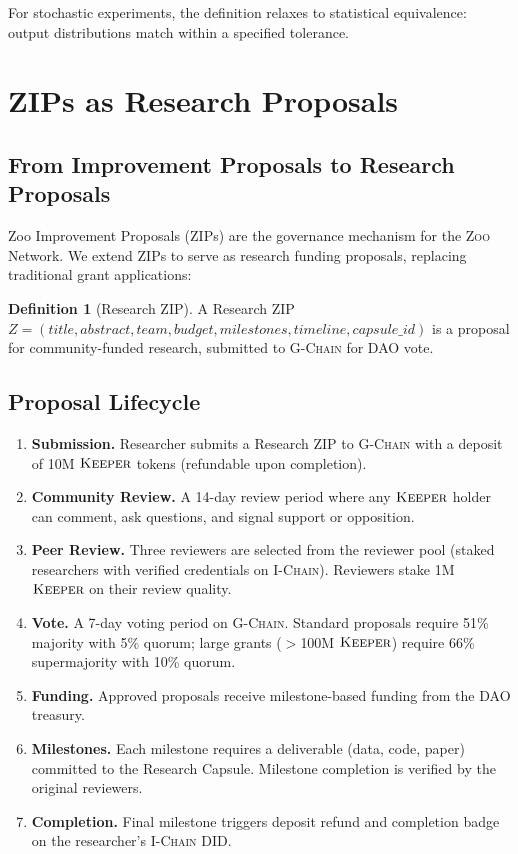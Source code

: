 \documentclass[11pt,letterpaper]{article}
\theoremstyle{definition}
\newtheorem{definition}{Definition}
\theoremstyle{remark}
\newcommand{\Zoo}{\textsc{Zoo}}
\newcommand{\IChain}{\textsc{I-Chain}}
\newcommand{\GChain}{\textsc{G-Chain}}
\newcommand{\KEEPER}{\textsc{Keeper}}
\newcommand{\DID}{\textsc{DID}}
\newcommand{\DAO}{\textsc{DAO}}
\newcommand{\ZIP}{\textsc{ZIP}}
\begin{document}
For stochastic experiments, the definition relaxes to statistical equivalence: output distributions match within a specified tolerance.

\section{ZIPs as Research Proposals}
\label{sec:zips}

\subsection{From Improvement Proposals to Research Proposals}

Zoo Improvement Proposals (\ZIP{}s) \cite{zoo-dao-governance} are the governance mechanism for the \Zoo{} Network. We extend \ZIP{}s to serve as research funding proposals, replacing traditional grant applications:

\begin{definition}[Research ZIP]
A Research \ZIP{} $Z = (\textit{title}, \textit{abstract}, \textit{team}, \textit{budget}, \textit{milestones}, \textit{timeline}, \textit{capsule\_id})$ is a proposal for community-funded research, submitted to \GChain{} for \DAO{} vote.
\end{definition}

\subsection{Proposal Lifecycle}

\begin{enumerate}
    \item \textbf{Submission.} Researcher submits a Research \ZIP{} to \GChain{} with a deposit of 10M $\KEEPER$ tokens (refundable upon completion).
    \item \textbf{Community Review.} A 14-day review period where any $\KEEPER$ holder can comment, ask questions, and signal support or opposition.
    \item \textbf{Peer Review.} Three reviewers are selected from the reviewer pool (staked researchers with verified credentials on \IChain{}). Reviewers stake 1M $\KEEPER$ on their review quality.
    \item \textbf{Vote.} A 7-day voting period on \GChain{}. Standard proposals require 51\% majority with 5\% quorum; large grants ($>$100M $\KEEPER$) require 66\% supermajority with 10\% quorum.
    \item \textbf{Funding.} Approved proposals receive milestone-based funding from the \DAO{} treasury.
    \item \textbf{Milestones.} Each milestone requires a deliverable (data, code, paper) committed to the Research Capsule. Milestone completion is verified by the original reviewers.
    \item \textbf{Completion.} Final milestone triggers deposit refund and completion badge on the researcher's \IChain{} \DID{}.
\end{enumerate}
\end{document}
